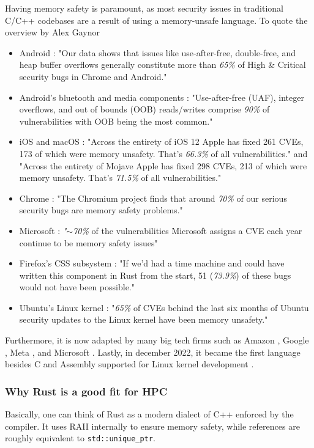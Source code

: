 Having memory safety is paramount, as most security issues in traditional C/C++ codebases are a result of using a memory-unsafe language. To quote the overview by Alex Gaynor \cite{gaynor}


\begin{itemize}
  \item Android \cite{androidmem}: "Our data shows that issues like use-after-free, double-free, and heap buffer overflows generally constitute more than \textit{65\%} of High \& Critical security bugs in Chrome and Android."
  \item Android’s bluetooth and media components \cite{androidmem2}: "Use-after-free (UAF), integer overflows, and out of bounds (OOB) reads/writes comprise \textit{90\%} of vulnerabilities with OOB being the most common."
  \item iOS and macOS \cite{iosmem}: "Across the entirety of iOS 12 Apple has fixed 261 CVEs, 173 of which were memory unsafety. That’s \textit{66.3\%} of all vulnerabilities." and "Across the entirety of Mojave Apple has fixed 298 CVEs, 213 of which were memory unsafety. That’s \textit{71.5\%} of all vulnerabilities."
  \item Chrome \cite{chromemem}: "The Chromium project finds that around \textit{70\%} of our serious security bugs are memory safety problems."
  \item Microsoft \cite{microsoftmem}: \textit{"$\sim$70\%} of the vulnerabilities Microsoft assigns a CVE each year continue to be memory safety issues"
  \item Firefox’s CSS subsystem \cite{ffmem}: "If we’d had a time machine and could have written this component in Rust from the start, 51 (\textit{73.9\%}) of these bugs would not have been possible."
  \item Ubuntu’s Linux kernel \cite{ubumem}: "\textit{65\%} of CVEs behind the last six months of Ubuntu security updates to the Linux kernel have been memory unsafety."
\end{itemize}

Furthermore, it is now adapted by many big tech firms such as Amazon \cite{awsrust}, Google \cite{googlerust}, Meta \cite{metarust}, and Microsoft \cite{msftrust}. Lastly, in december 2022, it became the first language besides C and Assembly supported for Linux kernel development \cite{linuxrust}.

\subsubsection{Why Rust is a good fit for HPC}
Basically, one can think of Rust as a modern dialect of C++ enforced by the compiler. It uses \ac{RAII} internally to ensure memory safety, while references are roughly equivalent to \texttt{std::unique\_ptr}.\\

